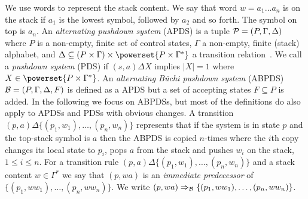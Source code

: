 \documentclass{llncs}
\begin{document}
 We  use words to represent the stack content. We say that word $w=a_1\ldots a_n$ is on the stack if $a_1$ is the lowest symbol, followed by $a_2$ and so forth. The symbol on top is $a_n$. An \emph{alternating pushdown system} (APDS) is a tuple $\mathcal{P}=(P,\Gamma,\Delta)$ where $P$ is a non-empty, finite set of control states, $\Gamma$ a non-empty, finite (stack) alphabet, and $\Delta\subseteq(P\times \Gamma)\times \powerset{P\times\Gamma^*}$ a transition relation~\cite{bouajjani1997reachability,suwimonteerabuth2006efficient-tr}. We call \APDS a \emph{pushdown system} (PDS) if $(s,a)\Delta X$ implies $|X|=1$ where $X\in\powerset{P\times\Gamma^*}$. An \emph{alternating B\"uchi pushdown system} (ABPDS) $\mathcal{B}=(P,\Gamma,\Delta,F)$ is defined as a APDS but a set of accepting states $F\subseteq P$ is added. In the following we  focus on ABPDSs, but most of the definitions do also apply to APDSs and PDSs with obvious changes. A transition $(p,a)\Delta\{(p_1,w_1),\ldots,(p_n,w_n)\}$ represents that if the system is in state $p$ and the top-stack symbol is $a$ then the ABPDS \ABPDS is copied $n$-times where the $i$th copy changes its local state to $p_i$, pops $a$ from the stack and pushes $w_i$ on the stack, $1\leq i\leq n$. For a  transition rule $(p,a)\Delta\{(p_1,w_1),\ldots,(p_n,w_n)\}$ and a stack content $w\in\Gamma^*$ we say that $(p,wa)$ is an \emph{immediate predecessor} of $\{(p_1,ww_1),\ldots,(p_n,ww_n)\}$. We write $(p,wa)\Rightarrow_\mathcal{B}\{(p_1,ww_1),\ldots,(p_n,ww_n)\}$.   \full{\\ }
\end{document}
